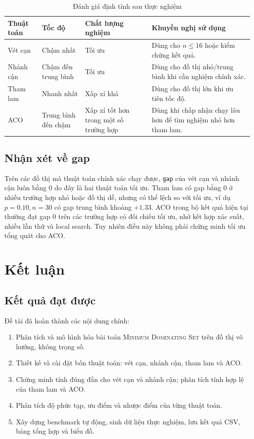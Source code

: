 \documentclass[12pt, a4paper]{report}
\newcommand{\MDS}{\textsc{Minimum Dominating Set}}
\begin{document}
\begin{table}[H]
  \centering
  \caption{Đánh giá định tính sau thực nghiệm}
  \begin{tabular}{p{3cm} p{3cm} p{3cm} p{4cm}}
    \toprule
    \textbf{Thuật toán} & \textbf{Tốc độ} & \textbf{Chất lượng nghiệm} & \textbf{Khuyến nghị sử dụng} \\
    \midrule
    Vét cạn & Chậm nhất & Tối ưu & Dùng cho $n \leq 16$ hoặc kiểm chứng kết quả. \\
    Nhánh cận & Chậm đến trung bình & Tối ưu & Dùng cho đồ thị nhỏ/trung bình khi cần nghiệm chính xác. \\
    Tham lam & Nhanh nhất & Xấp xỉ khá & Dùng cho đồ thị lớn khi ưu tiên tốc độ. \\
    ACO & Trung bình đến chậm & Xấp xỉ tốt hơn trong một số trường hợp & Dùng khi chấp nhận chạy lâu hơn để tìm nghiệm nhỏ hơn tham lam. \\
    \bottomrule
  \end{tabular}
\end{table}

\section{Nhận xét về gap}

Trên các đồ thị mà thuật toán chính xác chạy được, \texttt{gap} của vét cạn và nhánh cận luôn bằng 0 do
đây là hai thuật toán tối ưu. Tham lam có gap bằng 0 ở nhiều trường hợp nhỏ hoặc đồ thị dễ, nhưng có thể
lệch so với tối ưu, ví dụ $p=0.10,n=30$ có gap trung bình khoảng $+1.33$. ACO trong bộ kết quả hiện tại
thường đạt gap 0 trên các trường hợp có đối chiếu tối ưu, nhờ kết hợp xác suất, nhiều lần thử và local
search. Tuy nhiên điều này không phải chứng minh tối ưu tổng quát cho ACO.

\chapter{Kết luận}

\section{Kết quả đạt được}

Đề tài đã hoàn thành các nội dung chính:

\begin{enumerate}[leftmargin=*, label=\arabic*.]
  \item Phân tích và mô hình hóa bài toán \MDS{} trên đồ thị vô hướng, không trọng số.
  \item Thiết kế và cài đặt bốn thuật toán: vét cạn, nhánh cận, tham lam và ACO.
  \item Chứng minh tính đúng đắn cho vét cạn và nhánh cận; phân tích tính hợp lệ của tham lam và ACO.
  \item Phân tích độ phức tạp, ưu điểm và nhược điểm của từng thuật toán.
  \item Xây dựng benchmark tự động, sinh dữ liệu thực nghiệm, lưu kết quả CSV, bảng tổng hợp và biểu đồ.
\end{enumerate}
\end{document}
